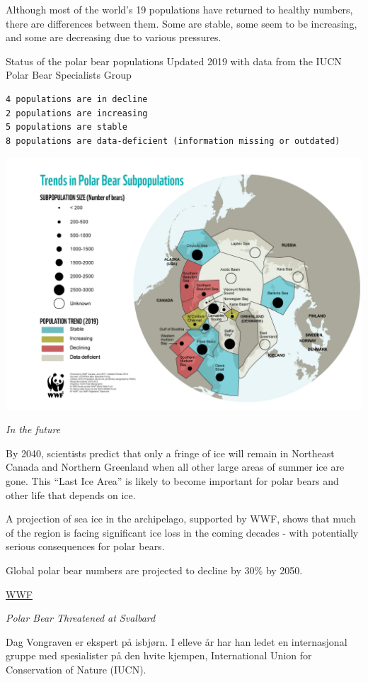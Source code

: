 \documentclass[
]{book}
\begin{document}
Although most of the world's 19 populations have returned to healthy numbers, there are differences between them. Some are stable, some seem to be increasing, and some are decreasing due to various pressures.

Status of the polar bear populations
Updated 2019 with data from the IUCN Polar Bear Specialists Group

\begin{verbatim}
4 populations are in decline
2 populations are increasing
5 populations are stable
8 populations are data-deficient (information missing or outdated)
\end{verbatim}

\includegraphics{fig/polar_bear_populations.png}

\emph{In the future}

By 2040, scientists predict that only a fringe of ice will remain in Northeast Canada and Northern Greenland when all other large areas of summer ice are gone. This ``Last Ice Area'' is likely to become important for polar bears and other life that depends on ice.

A projection of sea ice in the archipelago, supported by WWF, shows that much of the region is facing significant ice loss in the coming decades - with potentially serious consequences for polar bears.

Global polar bear numbers are projected to decline by 30\% by 2050.

\href{https://arcticwwf.org/species/polar-bear/population/}{WWF}

\emph{Polar Bear Threatened at Svalbard}

Dag Vongraven er ekspert på isbjørn. I elleve år har han ledet en internasjonal gruppe med spesialister på den hvite kjempen, International Union for Conservation of Nature (IUCN).
\end{document}
